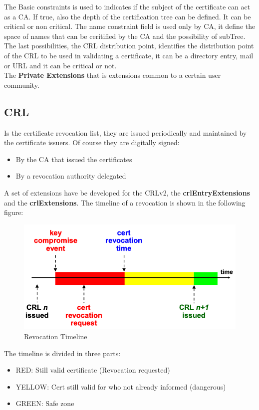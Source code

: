 \documentclass[12pt]{article}
\begin{document}
The Basic constraints is used to indicates if the subject of the certificate can act as a CA. If true, also the depth of the certification tree can be defined. It can be critical or non critical. The name constraint field is used only by CA, it define the space of names that can be ceritified by the CA and the possibility of subTree. The last possibilities, the CRL distribution point, identifies the distribution point of the CRL to be used in validating a certificate, it can be a directory entry, mail or URL and it can be critical or not.\\
The \textbf{Private Extensions} that is extensions common to a certain user community.

\subsection{CRL}
Is the certificate revocation list, they are issued periodically and maintained by the certificate issuers. Of course they are digitally signed:
\begin{itemize}
  \item By the CA that issued the certificates
  \item By a revocation authority delegated
\end{itemize}
A set of extensions have be developed for the CRLv2, the \textbf{crlEntryExtensions} and the \textbf{crlExtensions}. The timeline of a revocation is shown in the following figure:
\begin{figure}[H]
   \centering
   \includegraphics[width=\linewidth]{images/revoc_timeline.png}
   \caption{Revocation Timeline}
   \label{fig:revoc_timeline}
\end{figure}
The timeline is divided in three parts:
\begin{itemize}
  \item RED: Still valid certificate (Revocation requested)
  \item YELLOW: Cert still valid for who not already informed (dangerous)
  \item GREEN: Safe zone
\end{itemize}
\end{document}
